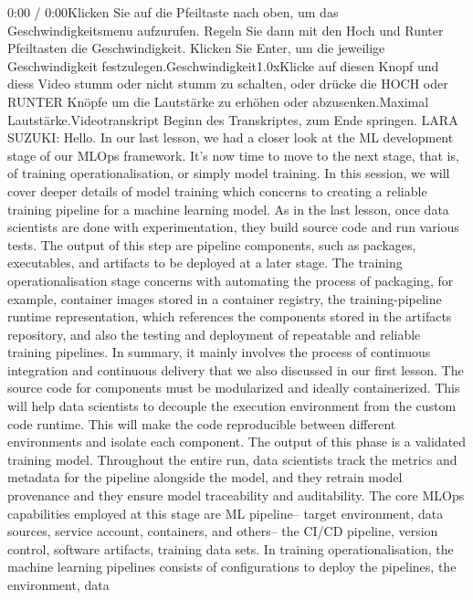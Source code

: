 {{{    0:00 / 0:00Klicken Sie auf die Pfeiltaste nach oben, um das Geschwindigkeitsmenu aufzurufen. Regeln Sie dann mit den Hoch und Runter Pfeiltasten die Geschwindigkeit. Klicken Sie Enter, um die jeweilige Geschwindigkeit festzulegen.Geschwindigkeit1.0xKlicke auf diesen Knopf und diess Video stumm oder nicht stumm zu schalten, oder drücke die HOCH oder RUNTER Knöpfe um die Lautstärke zu erhöhen oder abzusenken.Maximal Lautstärke.Videotranskript
    Beginn des Transkriptes, zum Ende springen.
    LARA SUZUKI: Hello.
    In our last lesson, we had a closer look at the ML development
    stage of our MLOps framework.
    It's now time to move to the next stage, that is,
    of training operationalisation, or simply model training.
    In this session, we will cover deeper details of model training
    which concerns to creating a reliable training
    pipeline for a machine learning model.
    As in the last lesson, once data scientists
    are done with experimentation, they build source code
    and run various tests.
    The output of this step are pipeline components,
    such as packages, executables, and artifacts
    to be deployed at a later stage.
    The training operationalisation stage concerns
    with automating the process of packaging,
    for example, container images stored in a container
    registry, the training-pipeline runtime representation, which references
    the components stored in the artifacts repository,
    and also the testing and deployment of repeatable and reliable training
    pipelines.
    In summary, it mainly involves the process
    of continuous integration and continuous delivery
    that we also discussed in our first lesson.
    The source code for components must be modularized and ideally containerized.
    This will help data scientists to decouple the execution environment
    from the custom code runtime.
    This will make the code reproducible between different environments
    and isolate each component.
    The output of this phase is a validated training model.
    Throughout the entire run, data scientists
    track the metrics and metadata for the pipeline alongside the model,
    and they retrain model provenance and they ensure
    model traceability and auditability.
    The core MLOps capabilities employed at this stage are ML pipeline--
    target environment, data sources, service account, containers,
    and others--
    the CI/CD pipeline, version control, software artifacts, training data sets.
    In training operationalisation, the machine learning pipelines
    consists of configurations to deploy the pipelines, the environment, data
}}}
